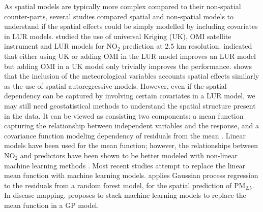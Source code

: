 \documentclass{article}
\begin{document}
As spatial models are typically more complex compared to their non-spatial counter-parts, several studies compared spatial and non-spatial models to understand if the spatial effects could be simply modelled by including covariates in LUR models. \cite{young2016satellite} studied the use of universal Kriging (UK), OMI satellite instrument \citep{OMI} and LUR models for NO$_2$ prediction at 2.5 km resolution. \cite{young2016satellite} indicated that either using UK or adding OMI in the LUR model improves an LUR model but adding OMI in a UK model only trivially improves the performance. \cite{BERTAZZON20159} shows that the inclusion of the meteorological variables accounts spatial effects similarly as the use of spatial autoregressive models. However, even if the spatial dependency can be captured by involving certain covariates in a LUR model, we may still need geostatistical methods to understand the spatial structure present in the data. It can be viewed as consisting two components: a mean function capturing the relationship between independent variables and the response, and a covariance function modeling dependency of residuals from the mean \citep{stackinla}. Linear models have been used for the mean function; however, the relationships between NO$_2$ and predictors have been shown to be better modeled with non-linear machine learning methods \citep{luglobal}. Most recent studies attempt to replace the linear mean function with machine learning models. \cite{liu2020integrate} applies Gaussian process regression to the residuals from a random forest model, for the spatial prediction of PM$_2.5$. In disease mapping. \cite{stackinla} proposes to stack machine learning models to replace the mean function in a GP model.   
\end{document}
